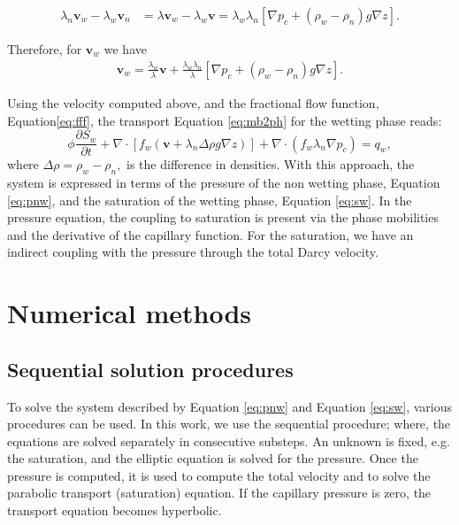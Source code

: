 \documentclass{article}
\begin{document}
\begin{align*}
\lambda_n\mathbf{v}_w-\lambda_w\mathbf{v}_n&=\lambda\mathbf{v}_w-\lambda_w\mathbf{v}
=\lambda_w\lambda_n [\nabla p_c+(\rho_w-\rho_n)g\nabla z].
\end{align*}\par
Therefore, for $\mathbf{v}_w$ we have
\begin{align*}
\mathbf{v}_w=\frac{\lambda_w}{\lambda}\mathbf{v}+\frac{\lambda_w\lambda_n}{\lambda} [\nabla p_c+(\rho_w-\rho_n)g\nabla z].
\end{align*}\par
Using the velocity computed above, and the fractional flow function, Equation\eqref{eq:fff}, the transport Equation \eqref{eq:mb2ph} for the wetting phase reads:
\begin{equation}\label{eq:sw}
 \phi\frac{\partial {S}_{w}}{\partial t}+\nabla \cdot [f_w( \mathbf{v}+\lambda_n\Delta  \rho g\nabla z)]+\nabla \cdot(f_w\lambda_n\nabla p_c)= q_w,
\end{equation}
where $\Delta \rho= \rho_w-\rho_n,$ is the difference in densities.
With this approach, the system is expressed in terms of the pressure of the non wetting phase, Equation \eqref{eq:pnw}, and the saturation of the wetting phase, Equation \eqref{eq:sw}.
In the pressure equation,
the coupling to saturation is present via the phase mobilities and the derivative of the capillary function. For the saturation, we have an indirect
coupling with the pressure through the total Darcy velocity. \\
\section{Numerical methods}\label{numet}
\subsection*{Sequential solution procedures}
\hspace{0.5cm}To solve the system described by Equation \eqref{eq:pnw} and Equation \eqref{eq:sw}, various procedures can be used. In this work, we use the sequential procedure; where, the equations are solved separately in consecutive substeps. An unknown is fixed, e.g.
the saturation, and the elliptic equation is solved for the pressure. Once the pressure is computed, it is used to compute the total velocity and to solve the parabolic transport (saturation) equation. 
If the capillary pressure is zero, the transport equation becomes hyperbolic.\par
\end{document}
